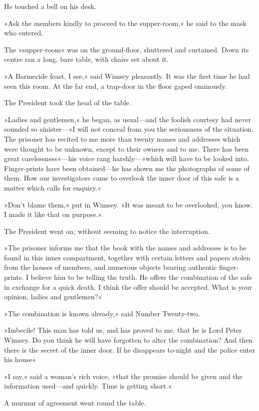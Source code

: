 He touched a bell on his desk.

»Ask the members kindly to proceed to the supper-room,« he said to the mask who entered.

The »supper-room« was on the ground-floor, shuttered and curtained. Down its centre ran a long, bare table, with chairs set about it.

»A Barmecide feast, I see,« said Wimsey pleasantly. It was the first time he had seen this room. At the far end, a trap-door in the floor gaped ominously.

The President took the head of the table.

»Ladies and gentlemen,« he began, as usual—and the foolish courtesy had never sounded so sinister—»I will not conceal from you the seriousness of the situation. The prisoner has recited to me more than twenty names and addresses which were thought to be unknown, except to their owners and to me. There has been great carelessness«—his voice rang harshly—»which will have to be looked into. Finger-prints have been obtained—he has shown me the photographs of some of them. How our investigators came to overlook the inner door of this safe is a matter which calls for enquiry.«

»Don't blame them,« put in Wimsey. »It was meant to be overlooked, you know. I made it like that on purpose.«

The President went on, without seeming to notice the interruption.

»The prisoner informs me that the book with the names and addresses is to be found in this inner compartment, together with certain letters and papers stolen from the houses of members, and numerous objects bearing authentic finger-prints. I believe him to be telling the truth. He offers the combination of the safe in exchange for a quick death. I think the offer should be accepted. What is your opinion, ladies and gentlemen?«

»The combination is known already,« said Number Twenty-two.

»Imbecile! This man has told us, and has proved to me, that he is Lord Peter Wimsey. Do you think he will have forgotten to alter the combination? And then there is the secret of the inner door. If he disappears to-night and the police enter his house\longdash«

»I say,« said a woman's rich voice, »that the promise should be given and the information used—and quickly. Time is getting short.«

A murmur of agreement went round the table.

